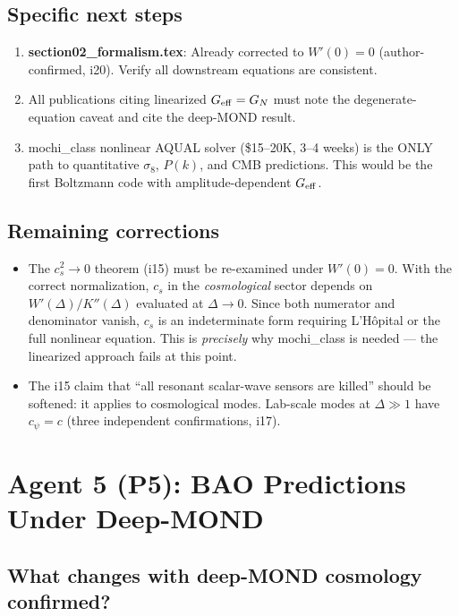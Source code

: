 \documentclass[11pt]{article}
\begin{document}
\subsection{Specific next steps}
\begin{enumerate}
\item \textbf{section02\_formalism.tex}: Already corrected to $W'(0) = 0$ (author-confirmed, i20).
Verify all downstream equations are consistent.
\item All publications citing linearized $G_{\rm eff} = G_N$ must note the degenerate-equation
caveat and cite the deep-MOND result.
\item mochi\_class nonlinear AQUAL solver (\$15--20K, 3--4 weeks) is the ONLY path to
quantitative $\sigma_8$, $P(k)$, and CMB predictions. This would be the first Boltzmann
code with amplitude-dependent $G_{\rm eff}$.
\end{enumerate}

\subsection{Remaining corrections}
\begin{itemize}
\item The $c_s^2 \to 0$ theorem (i15) must be re-examined under $W'(0) = 0$.
With the correct normalization, $c_s$ in the \emph{cosmological} sector depends
on $W'(\Delta)/K''(\Delta)$ evaluated at $\Delta \to 0$. Since both numerator
and denominator vanish, $c_s$ is an indeterminate form requiring L'H\^{o}pital
or the full nonlinear equation. This is \emph{precisely} why mochi\_class is
needed --- the linearized approach fails at this point.
\item The i15 claim that ``all resonant scalar-wave sensors are killed'' should be
softened: it applies to cosmological modes. Lab-scale modes at $\Delta \gg 1$
have $c_\psi = c$ (three independent confirmations, i17).
\end{itemize}

\newpage
\section{Agent 5 (P5): BAO Predictions Under Deep-MOND}
\label{sec:agent5}

\subsection{What changes with deep-MOND cosmology confirmed?}
\end{document}
